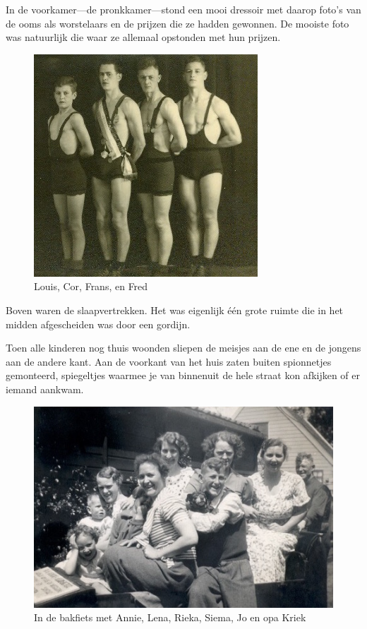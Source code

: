 \documentclass[10pt,twoside, openright]{memoir}
\begin{document}
In de voorkamer---de pronkkamer---stond een mooi dressoir met daarop foto’s van de ooms als worstelaars en de prijzen die ze hadden gewonnen. De mooiste foto was natuurlijk die waar ze allemaal opstonden met hun prijzen. 

\begin{figure}
\includegraphics[width=\textwidth]{img/ch3/Louiscorfransfred}
\caption*{\footnotesize Louis, Cor, Frans, en Fred}
\end{figure}

Boven waren de slaapvertrekken. Het was eigenlijk één grote ruimte die in het midden afgescheiden was door een gordijn. 

Toen alle kinderen nog thuis woonden sliepen de meisjes aan de ene en de jongens aan de andere kant. Aan de voorkant van het huis zaten buiten spionnetjes gemonteerd, spiegeltjes waarmee je van binnenuit de hele straat kon afkijken of er iemand aankwam. 

\begin{figure}
\includegraphics[width=\textwidth]{img/ch3/indebakfiets}
\caption*{\footnotesize In de bakfiets met Annie, Lena, Rieka, Siema, Jo en opa Kriek}
\end{figure}
\end{document}
